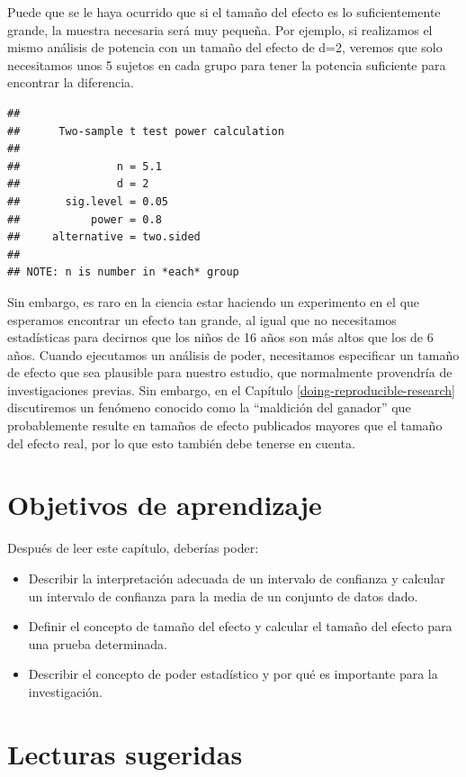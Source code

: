 \documentclass[
  12pt,
]{book}
\providecommand{\tightlist}{%
  \setlength{\itemsep}{0pt}\setlength{\parskip}{0pt}}
\begin{document}
Puede que se le haya ocurrido que si el tamaño del efecto es lo suficientemente grande, la muestra necesaria será muy pequeña. Por ejemplo, si realizamos el mismo análisis de potencia con un tamaño del efecto de d=2, veremos que solo necesitamos unos 5 sujetos en cada grupo para tener la potencia suficiente para encontrar la diferencia.

\begin{verbatim}
## 
##      Two-sample t test power calculation 
## 
##               n = 5.1
##               d = 2
##       sig.level = 0.05
##           power = 0.8
##     alternative = two.sided
## 
## NOTE: n is number in *each* group
\end{verbatim}

Sin embargo, es raro en la ciencia estar haciendo un experimento en el que esperamos encontrar un efecto tan grande, al igual que no necesitamos estadísticas para decirnos que los niños de 16 años son más altos que los de 6 años. Cuando ejecutamos un análisis de poder, necesitamos especificar un tamaño de efecto que sea plausible para nuestro estudio, que normalmente provendría de investigaciones previas. Sin embargo, en el Capítulo \ref{doing-reproducible-research} discutiremos un fenómeno conocido como la ``maldición del ganador'' que probablemente resulte en tamaños de efecto publicados mayores que el tamaño del efecto real, por lo que esto también debe tenerse en cuenta.

\hypertarget{objetivos-de-aprendizaje-9}{%
\section{Objetivos de aprendizaje}\label{objetivos-de-aprendizaje-9}}

Después de leer este capítulo, deberías poder:

\begin{itemize}
\tightlist
\item
  Describir la interpretación adecuada de un intervalo de confianza y calcular un intervalo de confianza para la media de un conjunto de datos dado.
\item
  Definir el concepto de tamaño del efecto y calcular el tamaño del efecto para una prueba determinada.
\item
  Describir el concepto de poder estadístico y por qué es importante para la investigación.
\end{itemize}

\hypertarget{lecturas-sugeridas-7}{%
\section{Lecturas sugeridas}\label{lecturas-sugeridas-7}}
\end{document}
